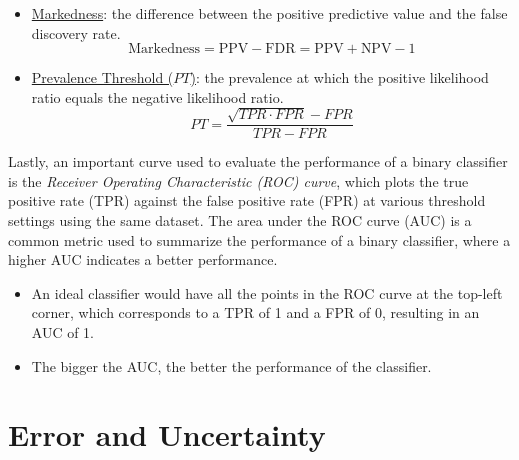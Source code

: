 \begin{itemize}
    \begin{equation} \label{label:informedness}
        \text{Informedness} = \text{TPR} - \text{FPR} = \text{TPR} + \text{TNR} - 1
    \end{equation}
    \item \ul{Markedness}: the difference between the positive predictive value and the false discovery rate.
    \begin{equation} \label{label:markedness}
        \text{Markedness} = \text{PPV} - \text{FDR} = \text{PPV} + \text{NPV} - 1
    \end{equation}
    \item \ul{Prevalence Threshold ($PT$)}: the prevalence at which the positive likelihood ratio equals the negative likelihood ratio.
    \begin{equation} \label{label:pt}
        PT = \dfrac{\sqrt{TPR \cdot FPR} - FPR}{TPR - FPR}
    \end{equation}
\end{itemize}

Lastly, an important curve used to evaluate the performance of a binary classifier is the \emph{Receiver Operating Characteristic (ROC) curve}, which plots the true positive rate (TPR) against the false positive rate (FPR) at various threshold settings using the same dataset. The area under the ROC curve (AUC) is a common metric used to summarize the performance of a binary classifier, where a higher AUC indicates a better performance.
\begin{itemize}
    \item An ideal classifier would have all the points in the ROC curve at the top-left corner, which corresponds to a TPR of 1 and a FPR of 0, resulting in an AUC of 1.
    \item The bigger the AUC, the better the performance of the classifier.
\end{itemize}

\section{Error and Uncertainty}

